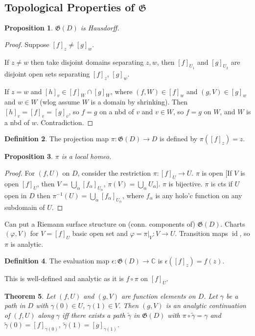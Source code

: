 \documentclass{article}
\theoremstyle{definition}
\newtheorem{defn}{Definition}[section]
\theoremstyle{remark}
\theoremstyle{plain}
\newtheorem{thm}[defn]{Theorem}
\newtheorem{prop}[defn]{Proposition}
\newcommand{\CC}{\mathbb{C}}
\newcommand{\id}{\operatorname{id}}
\begin{document}
\subsection{Topological Properties of $\mathfrak G$}
\begin{prop}
    $\mathfrak G(D)$ is Hausdorff.
\end{prop}
\begin{proof}
    Suppose $[f]_z\neq [g]_w$.

    
    If $z\neq w$ then take disjoint domains separating $z,w$, then $[f]_{U_1}$ and $[g]_{U_2}$ are disjoint open sets separating $[f]_z$, $[g]_w$.

    If $z=w$ and $[h]_v\in[f]_W\cap [g]_W$, where $(f,W)\in [f]_w$ and $(g,V)\in [g]_w$ and $w\in W$ (wlog assume $W$ is a domain by shrinking). Then $[h]_v=[f]_v=[g]_v$, so $f=g$ on a nbd of $v$ and $v\in W$, so $f=g$ on $W$, and $W$ is a nbd of $w$. Contradiction. 
\end{proof}
\begin{defn}
     The projection map $\pi:\mathfrak G(D)\to D$ is defined by $\pi([f]_z)=z$.
\end{defn}
\begin{prop}
    $\pi$ is a local homeo.
\end{prop}
\begin{proof}
    For $(f,U)$ on $D$, consider the restriction $\pi:[f]_U\to U$. $\pi$ is open [If $V$ is open $[f]_U$, then $V=\bigcup_\alpha[f_\alpha]_{U_\alpha}$, $\pi(V)=\bigcup_\alpha U_\alpha$]. $\pi$ is bijective. $\pi$ is cts if $U$ open in $D$ then $\pi^{-1}(U)=\bigcup_{\alpha}[f_\alpha]_{U_\alpha}$, where $f_\alpha$ is any holo'c function on any subdomain of $U$.
\end{proof}
Can put a Riemann surface structure on (conn. components of) $\mathfrak G(D)$. Charts $(\varphi,V)$ for $V=[f]_U$ basic open set and $\varphi=\pi|_{V}:V\to U$. Transition maps $\id$, so $\pi$ is analytic.
\begin{defn}
    The evaluation map $\epsilon:\mathfrak G(D)\to\CC$ is $\epsilon([f]_z)=f(z)$.
\end{defn}
This is well-defined and analytic as it is $f\circ\pi$ on $[f]_U$.
\begin{thm}
    Let $(f,U)$ and $(g,V)$ are function elements on $D$. Let $\gamma$ be a path in $D$ with $\gamma(0)\in U$, $\gamma(1)\in V$. Then $(g,V)$ is an analytic continuation of $(f,U)$ along $\gamma$ iff there exists a path $\tilde\gamma$ in $\mathfrak G(D)$ with $\pi\circ\tilde\gamma=\gamma$ and $\tilde\gamma(0)=[f]_{\gamma(0)},\ \tilde\gamma(1)=[g]_{\gamma(1)}$.
\end{thm}
\end{document}
